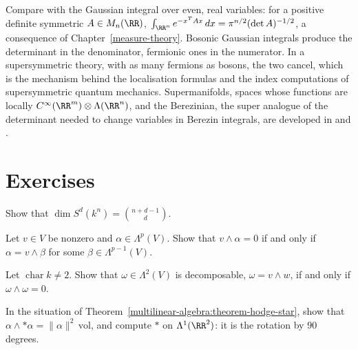 \begin{remark}\label{multilinear-algebra:remark-boson-fermion}
Compare with the Gaussian integral over even, real variables: for a positive definite symmetric $A \in M_n(\RR)$, $\int_{\RR^n}e^{-x^TAx}\,dx = \pi^{n/2}(\det A)^{-1/2}$, a consequence of
Chapter~\ref{measure-theory}. Bosonic Gaussian integrals produce the determinant in the denominator, fermionic ones in the numerator. In a supersymmetric theory, with as many fermions as bosons, the
two cancel, which is the mechanism behind the localisation formulas and the index computations of supersymmetric quantum mechanics. Supermanifolds, spaces whose functions are locally
$C^\infty(\RR^m) \otimes \Lambda(\RR^n)$, and the Berezinian, the super analogue of the determinant needed to change variables in Berezin integrals, are developed in \cite{varadarajan-supersymmetry} and
\cite{deligne-morgan-supersymmetry}.
\end{remark}

\section{Exercises}\label{multilinear-algebra:section-exercises}

\begin{exercise}\label{multilinear-algebra:exercise-symmetric-dimension}
Show that $\dim S^d(k^n) = \binom{n + d - 1}{d}$.
\end{exercise}

\begin{exercise}\label{multilinear-algebra:exercise-divisibility}
Let $v \in V$ be nonzero and $\alpha \in \Lambda^p(V)$. Show that $v \wedge \alpha = 0$ if and only if $\alpha = v \wedge \beta$ for some
$\beta \in \Lambda^{p-1}(V)$.
\end{exercise}

\begin{exercise}\label{multilinear-algebra:exercise-plucker}
Let $\operatorname{char} k \neq 2$. Show that $\omega \in \Lambda^2(V)$ is decomposable, $\omega = v \wedge w$, if and only if
$\omega \wedge \omega = 0$.
\end{exercise}

\begin{exercise}\label{multilinear-algebra:exercise-star-norm}
In the situation of Theorem~\ref{multilinear-algebra:theorem-hodge-star}, show that
$\alpha \wedge *\alpha = \|\alpha\|^2\,\mathrm{vol}$, and compute $*$ on $\Lambda^1(\RR^2)$: it is the rotation by $90$ degrees.
\end{exercise}

